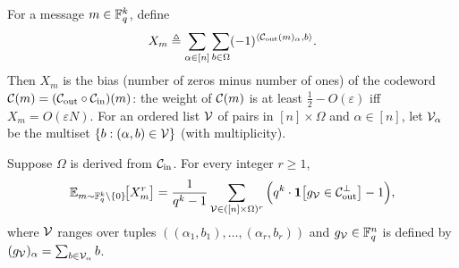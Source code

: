 \begin{definition}
  \label{def:Xm}
  For a message $m \in \mathbb{F}_q^k$, define
  \[
    X_m \triangleq \sum_{\alpha \in [n]}\sum_{b \in \Omega}
      (-1)^{\langle \mathcal{C}_{\mathrm{out}}(m)_\alpha, b\rangle} .
  \]
  Then $X_m$ is the bias (number of zeros minus number of ones) of the codeword
  $\mathcal{C}(m) = (\mathcal{C}_{\mathrm{out}} \circ \mathcal{C}_{\mathrm{in}})(m)$: the weight of $\mathcal{C}(m)$ is at least
  $\frac12 - O(\varepsilon)$ iff $X_m = O(\varepsilon N)$. For an ordered list
  $\mathcal{V}$ of pairs in $[n]\times\Omega$ and $\alpha \in [n]$, let
  $\mathcal{V}_\alpha$ be the multiset $\{b : (\alpha,b) \in \mathcal{V}\}$ (with
  multiplicity).
\end{definition}

\begin{lemma}
  \label{lem:moment-formula}
  Suppose $\Omega$ is derived from $\mathcal{C}_{\mathrm{in}}$. For every integer $r \geq 1$,
  \[
    \mathbb{E}_{m \sim \mathbb{F}_q^k \setminus \{0\}}\!\big[X_m^r\big] =
      \frac{1}{q^k - 1}\sum_{\mathcal{V} \in ([n]\times\Omega)^r}
      \Big(q^k\cdot \mathbf{1}\big[g_{\mathcal{V}} \in \mathcal{C}_{\mathrm{out}}^\perp\big] - 1\Big),
  \]
  where $\mathcal{V}$ ranges over tuples $((\alpha_1,b_1),\dots,(\alpha_r,b_r))$ and
  $g_{\mathcal{V}} \in \mathbb{F}_q^n$ is defined by $(g_{\mathcal{V}})_\alpha = \sum_{b \in \mathcal{V}_\alpha} b$.
\end{lemma}
